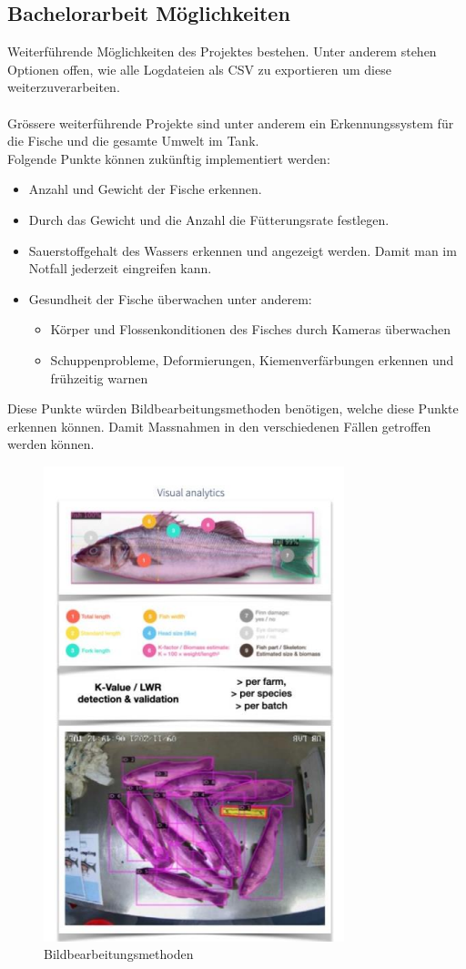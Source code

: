 \documentclass[../main.tex]{subfiles}
\begin{document}
	\subsection{Bachelorarbeit Möglichkeiten}
	Weiterführende Möglichkeiten des Projektes bestehen. Unter anderem stehen Optionen offen, wie alle Logdateien als CSV zu exportieren um diese weiterzuverarbeiten.
	\\ \\
	Grössere weiterführende Projekte sind unter anderem ein Erkennungssystem für die Fische und die gesamte Umwelt im Tank. \\
	Folgende Punkte können zukünftig implementiert werden:
	\begin{itemize}
		\item Anzahl und Gewicht der Fische erkennen.
		\item Durch das Gewicht und die Anzahl die Fütterungsrate festlegen.
		\item Sauerstoffgehalt des Wassers erkennen und angezeigt werden. Damit man im Notfall jederzeit eingreifen kann.
		\item Gesundheit der Fische überwachen unter anderem:
		\begin{itemize}
			\item Körper und Flossenkonditionen des Fisches durch Kameras überwachen
			\item Schuppenprobleme, Deformierungen, Kiemenverfärbungen erkennen und frühzeitig warnen
		\end{itemize}
	\end{itemize}	
	Diese Punkte würden Bildbearbeitungsmethoden benötigen, welche diese Punkte erkennen können. Damit Massnahmen in den verschiedenen Fällen getroffen werden können. 
	\par 
	\begin{figure}[H]
		\centering
		\includegraphics{../images/Imageprocessing} 
		\caption{Bildbearbeitungsmethoden}
		\label{fig:Imageprocessing}
	\end{figure}
	
\end{document}
